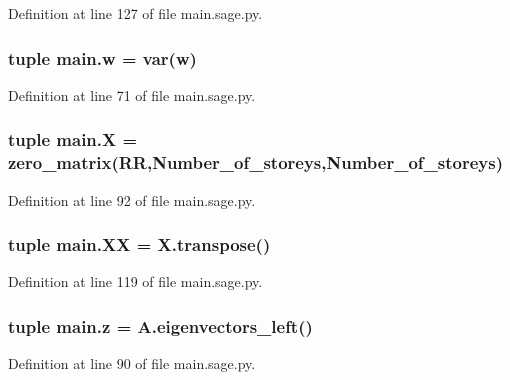 Definition at line 127 of file main.\+sage.\+py.

\hypertarget{a00039_af76005101c339a32cd5d37ba82ee072c}{}
\subsubsection[{w}]{\setlength{\rightskip}{0pt plus 5cm}tuple main.\+w = var(\textquotesingle{}w\textquotesingle{})}\label{a00039_af76005101c339a32cd5d37ba82ee072c}


Definition at line 71 of file main.\+sage.\+py.

\hypertarget{a00039_a5eac8e4368036ef94463d6e42c1628c5}{}
\subsubsection[{X}]{\setlength{\rightskip}{0pt plus 5cm}tuple main.\+X = zero\+\_\+matrix(R\+R,Number\+\_\+of\+\_\+storeys,Number\+\_\+of\+\_\+storeys)}\label{a00039_a5eac8e4368036ef94463d6e42c1628c5}


Definition at line 92 of file main.\+sage.\+py.

\hypertarget{a00039_ae18df6a00aee4516c7ad8961b666e2a3}{}
\subsubsection[{X\+X}]{\setlength{\rightskip}{0pt plus 5cm}tuple main.\+X\+X = X.\+transpose()}\label{a00039_ae18df6a00aee4516c7ad8961b666e2a3}


Definition at line 119 of file main.\+sage.\+py.

\hypertarget{a00039_a2d5b336e3b2f7d2e14f04fa3cc413457}{}
\subsubsection[{z}]{\setlength{\rightskip}{0pt plus 5cm}tuple main.\+z = A.\+eigenvectors\+\_\+left()}\label{a00039_a2d5b336e3b2f7d2e14f04fa3cc413457}


Definition at line 90 of file main.\+sage.\+py.

